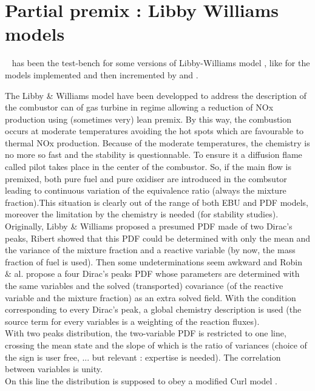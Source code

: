 \section*{Partial premix : Libby Williams models}

\CS~ has been the test-bench for some versions of Libby-Williams model \cite{3},
like for the models implemented and then incremented by \cite{4} and \cite{5}.

The Libby \& Williams model have been developped to address the description of
the combustor can of gas turbine in regime allowing a reduction of NOx
production using (sometimes very) lean premix. By this way, the combustion
occurs at moderate temperatures avoiding the hot spots which are favourable to
thermal NOx production. Because of the moderate temperatures, the chemistry is
no more so fast and the stability is questionnable. To ensure it a diffusion
flame called pilot takes place in the center of the combustor. So, if the main
flow is premixed, both pure fuel and pure oxidiser are introduced in the
combsutor leading to continuous variation of the equivalence ratio (always the
mixture fraction).This situation is clearly out of the range of both EBU and PDF
models, moreover the limitation by the chemistry is needed (for stability studies).\\
Originally, Libby \& Williams proposed a presumed PDF made of two Dirac's peaks,
Ribert showed that this PDF could be determined with only the mean and the
variance of the mixture fraction and a reactive variable (by now, the mass
fraction of fuel is used). Then some undeterminations seem awkward and Robin \&
al. propose a four Dirac's peaks PDF whose parameters are determined with the
same variables and the solved ({\small transported}) covariance (of the reactive
variable and the mixture fraction) as an extra solved field. With the condition
corresponding to every Dirac's peak, a global chemistry description is used (the
source term for every variables is a weighting of the reaction fluxes).\\

With two peaks distribution, the two-variable PDF is restricted to one line,
crossing the mean state and the slope of which is the ratio of
variances (choice of the sign is user free, ... but relevant : expertise is needed). The correlation between variables is unity.\\
On this line the distribution is supposed to obey a modified Curl model \cite{6}.\\
 
